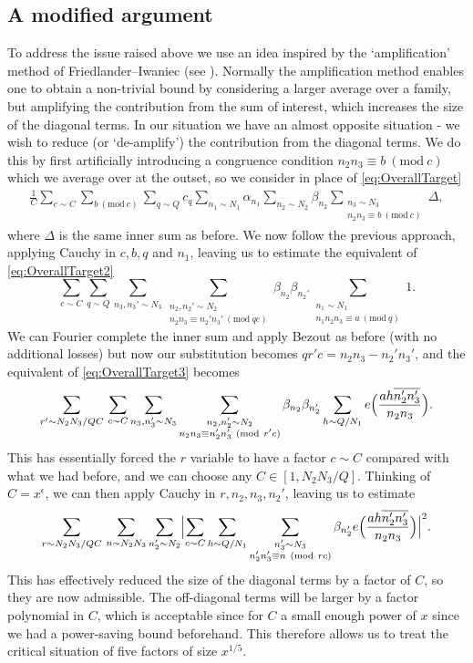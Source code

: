 \documentclass[10pt]{amsart}
\theoremstyle{plain}
\numberwithin{equation}{section}
\newcommand{\Mod}[1]{\ (\mathrm{mod}\ #1)}
\begin{document}
\subsection{A modified argument} \label{sec:OutlineModified}
%
%
%
%
To address the issue raised above we use an idea inspired by the `amplification' method of Friedlander--Iwaniec (see \cite{FriedlanderICM}). Normally the amplification method enables one to obtain a non-trivial bound by considering a larger average over a family, but amplifying the contribution from the sum of interest, which increases the size of the diagonal terms. In our situation we have an almost opposite situation - we wish to reduce (or `de-amplify') the contribution from the diagonal terms. We do this by first artificially introducing a congruence condition $n_2n_3\equiv b\Mod{c}$ which we average over at the outset, so we consider in place of \eqref{eq:OverallTarget}
\begin{align*}
\frac{1}{C}\sum_{c\sim C}\sum_{b\Mod{c}}\sum_{q\sim Q}c_q\sum_{n_1\sim N_1}\alpha_{n_1}\sum_{n_2\sim N_2}\beta_{n_2}\sum_{\substack{n_3\sim N_3\\ n_2n_3\equiv b\Mod{c}}}\Delta,
\end{align*}
where $\Delta$ is the same inner sum as before. We now follow the previous approach, applying Cauchy in $c,b,q$ and $n_1$, leaving us to estimate the equivalent of \eqref{eq:OverallTarget2}
\[
\sum_{c\sim C}\sum_{q\sim Q}\sum_{n_3,n_3'\sim N_3}\sum_{\substack{n_2,n_2'\sim N_2\\ n_2n_3\equiv n_2'n_3'\Mod{q c}}}\beta_{n_2}\beta_{n_2'}\sum_{\substack{n_1\sim N_1\\ n_1n_2n_3\equiv a\Mod{q}}}1.
\]
We can Fourier complete the inner sum and apply Bezout as before (with no additional losses) but now our substitution becomes $q r' c=n_2n_3-n_2'n_3'$, and the equivalent of \eqref{eq:OverallTarget3} becomes
\begin{equation*}
\sum_{r'\sim N_2 N_3/QC}\,\sum_{c\sim C}\sum_{n_3,n_3'\sim N_3}\sum_{\substack{n_2,n_2'\sim N_2\\ n_2n_3\equiv n_2'n_3'\Mod{r'c}}}\beta_{n_2}\beta_{n_2'}\sum_{h\sim Q/N_1}e\Bigl(\frac{ah\overline{n_2'n_3'}}{n_2n_3}\Bigr).
\end{equation*}
This has essentially forced the $r$ variable to have a factor $c\sim C$ compared with what we had before, and we can choose any $C\in[1,N_2N_3/Q]$. Thinking of $C=x^\epsilon$, we can then apply Cauchy in $r,n_2,n_3,n_2'$, leaving us to estimate
\begin{equation*}
\sum_{r\sim N_2N_3/QC}\,\sum_{n\sim N_2N_3}\sum_{n_2'\sim N_2}\Bigl|\sum_{c\sim C}\sum_{h\sim Q/N_1}\sum_{\substack{n_3'\sim N_3\\ n_2'n_3'\equiv n\Mod{rc}}}\beta_{n_2'}e\Bigl(\frac{ah\overline{n_2'n_3'}}{n_2n_3}\Bigr)\Bigr|^2.
\end{equation*}
This has effectively reduced the size of the diagonal terms by a factor of $C$, so they are now admissible. The off-diagonal terms will be larger by a factor polynomial in $C$, which is acceptable since for $C$ a small enough power of $x$ since we had a power-saving bound beforehand. This therefore allows us to treat the critical situation of five factors of size $x^{1/5}$.
\end{document}
